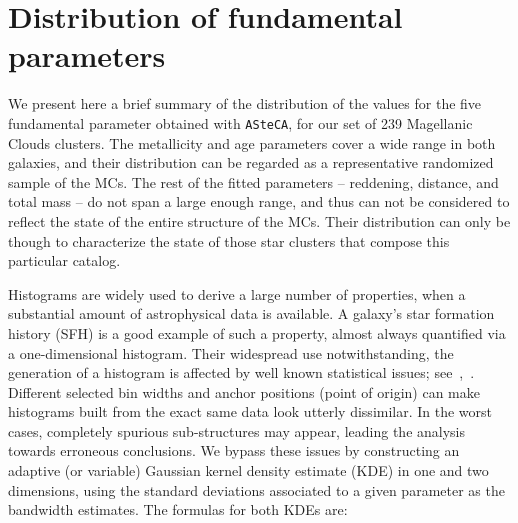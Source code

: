 \documentclass{aa}
\begin{document}

\section{Distribution of fundamental parameters}
\label{sec:param-dist}

We present here a brief summary of the distribution of the values for the five
fundamental parameter obtained with \texttt{ASteCA}, for our set of 239
Magellanic Clouds clusters. The metallicity and age parameters cover a wide
range in both galaxies, and their distribution can be regarded as a
representative randomized sample of the MCs.
%
The rest of the fitted parameters -- reddening, distance, and total mass -- do
not span a large enough range, and thus can not be considered to reflect the
state of the entire structure of the MCs. Their distribution can only be
though to characterize the state of those star clusters that compose this
particular catalog.

%


Histograms are widely used to derive a large number of properties, when a
substantial amount of astrophysical data is available. A galaxy's star
formation history (SFH) is a good example of such a property, almost always
quantified via a one-dimensional histogram.
%
Their widespread use notwithstanding, the generation of a histogram is affected
by well known statistical issues;
see~\cite{Silverman_1986},~\cite{Simonoff_1997}. Different selected bin widths
and anchor positions (point of origin) can make histograms built
from the exact same data look utterly dissimilar. In the worst cases, completely
spurious sub-structures may appear, leading the analysis towards erroneous
conclusions.
%
We bypass these issues by constructing an adaptive (or variable) Gaussian kernel
density estimate (KDE) in one and two dimensions, using the standard deviations
associated to a given parameter as the bandwidth estimates. The formulas for
both KDEs are:
\end{document}
